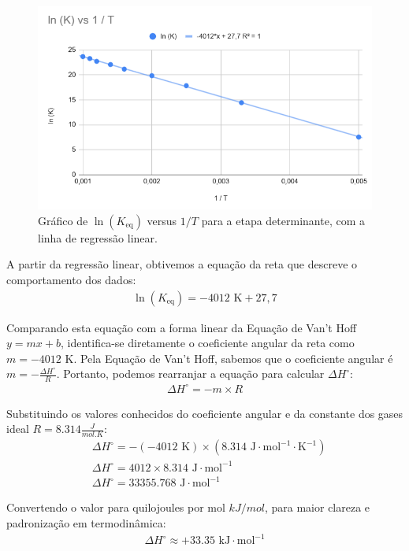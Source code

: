 \begin{figure}[H]
\centering
\includegraphics[width=0.7\linewidth]{fig/regressao.png}
\caption{Gráfico de \(\ln(K_\text{eq})\) versus \(1/T\) para a etapa determinante, com a linha de regressão linear.}\label{fig:vant}
\end{figure}

A partir da regressão linear, obtivemos a equação da reta que descreve o comportamento dos dados:
\begin{align*}
\ln(K_\text{eq}) = -4012 \text{ K} + 27,7
\end{align*}

Comparando esta equação com a forma linear da Equação de Van't Hoff \(y = mx + b\), identifica-se diretamente o coeficiente angular da reta como \(m = -4012 \text{ K}\). Pela Equação de Van't Hoff, sabemos que o coeficiente angular é \(m = -\frac{\Delta H^\circ}{R}\). Portanto, podemos rearranjar a equação para calcular \(\Delta H^\circ\):
\begin{align*}
    \Delta H^\circ = -m \times R
\end{align*}

Substituindo os valores conhecidos do coeficiente angular e da constante dos gases ideal \(R = 8.314 \frac{J}{mol.K}\):
\begin{align*}
& \Delta H^\circ = -(-4012 \text{ K}) \times (8.314 \text{ J} \cdot \text{mol}^{-1} \cdot \text{K}^{-1}) \\
& \Delta H^\circ = 4012 \times 8.314 \text{ J} \cdot \text{mol}^{-1} \\
& \Delta H^\circ = 33355.768 \text{ J} \cdot \text{mol}^{-1}
\end{align*}

Convertendo o valor para quilojoules por mol \(kJ/mol\), para maior clareza e padronização em termodinâmica:
\begin{align*}
    \Delta H^\circ \approx +33.35 \text{ kJ} \cdot \text{mol}^{-1}
\end{align*}

